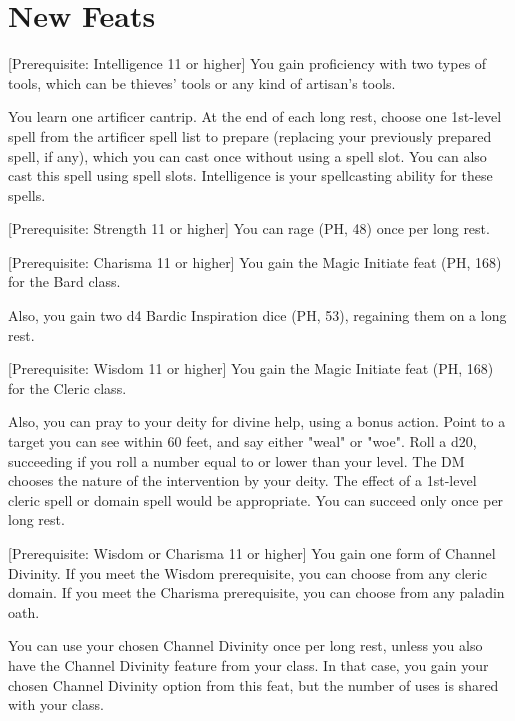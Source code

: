 \documentclass[letterpaper,twocolumn,openany,nodeprecatedcode,bg=print]{dndbook}
\begin{document}
\appendix

\newpage

\section{New Feats}

[Prerequisite: Intelligence 11 or higher]
\label{artificer-initiate}
You gain proficiency with two types of tools, which can be thieves' tools or any kind of artisan's tools.

You learn one artificer cantrip. 
At the end of each long rest, choose one 1st-level spell from the artificer spell list to prepare (replacing your previously prepared spell, if any), which you can cast once without using a spell slot. 
You can also cast this spell using spell slots. 
Intelligence is your spellcasting ability for these spells.

[Prerequisite: Strength 11 or higher]
\label{barbarian-initiate}
You can rage (PH, 48) once per long rest.

[Prerequisite: Charisma 11 or higher]
\label{bard-initiate}
You gain the Magic Initiate feat (PH, 168) for the Bard class.

Also, you gain two d4 Bardic Inspiration dice (PH, 53), regaining them on a long rest.

[Prerequisite: Wisdom 11 or higher]
\label{cleric-initiate}
You gain the Magic Initiate feat (PH, 168) for the Cleric class.

Also, you can pray to your deity for divine help, using a bonus action. 
Point to a target you can see within 60 feet, and say either "weal" or "woe". 
Roll a d20, succeeding if you roll a number equal to or lower than your level.
The DM chooses the nature of the intervention by your deity.
The effect of a 1st-level cleric spell or domain spell would be appropriate. 
You can succeed only once per long rest.

[Prerequisite: Wisdom or Charisma 11 or higher]
\label{divine-adept}
You gain one form of Channel Divinity. 
If you meet the Wisdom prerequisite, you can choose from any cleric domain. 
If you meet the Charisma prerequisite, you can choose from any paladin oath. 

You can use your chosen Channel Divinity once per long rest, unless you also have the Channel Divinity feature from your class. In that case, you gain your chosen Channel Divinity option from this feat, but the number of uses is shared with your class.
\end{document}

